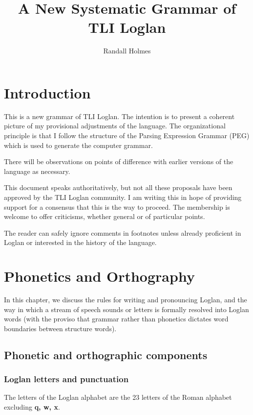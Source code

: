\documentclass[12pt]{book}
\title{A New Systematic Grammar of TLI Loglan}
\author{Randall Holmes}
\begin{document}
\maketitle

\chapter{Introduction}

This is a new grammar of TLI Loglan.   The intention is to present a coherent picture of my provisional adjustments of the language.  The organizational principle is that I follow the structure of the Parsing  Expression Grammar (PEG) which is used to generate the computer grammar.

There will be observations on points of difference with earlier versions of the language as necessary.

This document speaks authoritatively, but not all these proposals have been approved by the TLI Loglan community.  I am writing this in hope of providing support for a consensus that this is the way to proceed.  The membership is welcome to offer criticisms, whether general or of particular points.

The reader can safely ignore comments in footnotes unless already proficient in Loglan or interested in the history of the language.

\chapter{Phonetics and Orthography}

In this chapter, we discuss the rules for writing and pronouncing Loglan, and the way in which a stream of speech sounds or letters is formally resolved into Loglan words (with the proviso that grammar rather than phonetics dictates word boundaries between structure words).

\section{Phonetic and orthographic components}


\subsection{Loglan letters and punctuation}

The letters of the Loglan alphabet are the 23 letters of the Roman alphabet excluding {\bf q, w, x}. 
\end{document}
